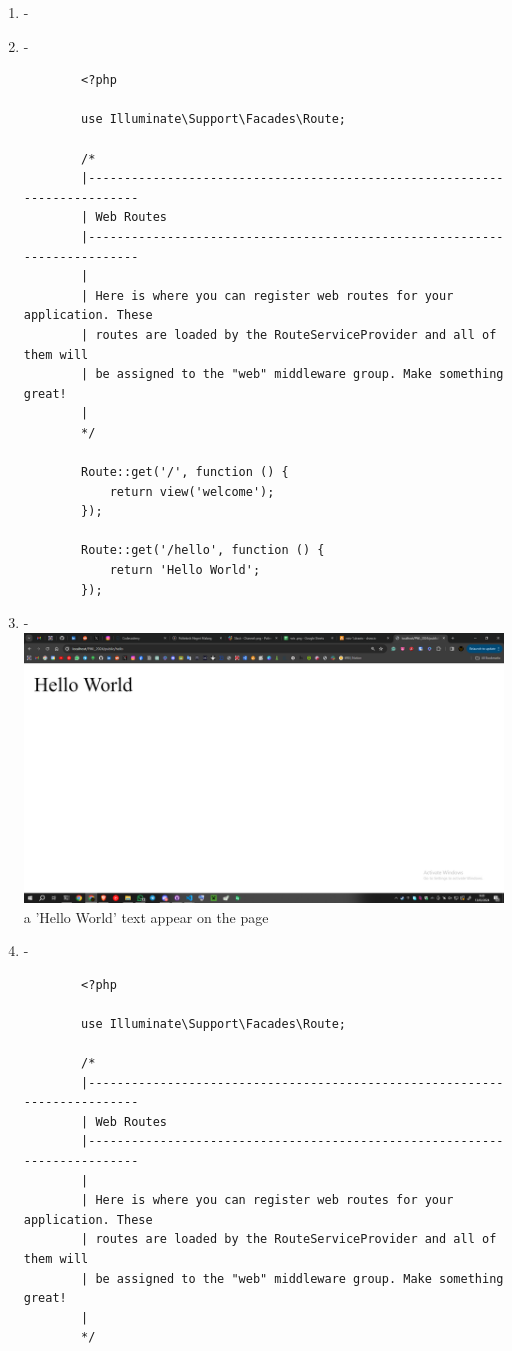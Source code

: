 \documentclass[12pt,titlepage]{article}
\begin{document}
\begin{enumerate}[label=\alph*.]
    \item -
    \item -
    \begin{verbatim}
        <?php

        use Illuminate\Support\Facades\Route;
        
        /*
        |--------------------------------------------------------------------------
        | Web Routes
        |--------------------------------------------------------------------------
        |
        | Here is where you can register web routes for your application. These
        | routes are loaded by the RouteServiceProvider and all of them will
        | be assigned to the "web" middleware group. Make something great!
        |
        */
        
        Route::get('/', function () {
            return view('welcome');
        });
        
        Route::get('/hello', function () {
            return 'Hello World';
        });
    \end{verbatim}
    \newpage
    \item - \\ \includegraphics[width=.9\textwidth]{images/figures/basic routing c.png} \\ a 'Hello World' text appear on the page
    \newpage
    \item -
    \begin{verbatim}
        <?php

        use Illuminate\Support\Facades\Route;
        
        /*
        |--------------------------------------------------------------------------
        | Web Routes
        |--------------------------------------------------------------------------
        |
        | Here is where you can register web routes for your application. These
        | routes are loaded by the RouteServiceProvider and all of them will
        | be assigned to the "web" middleware group. Make something great!
        |
        */
        

\end{verbatim}
\end{enumerate}
\end{document}
